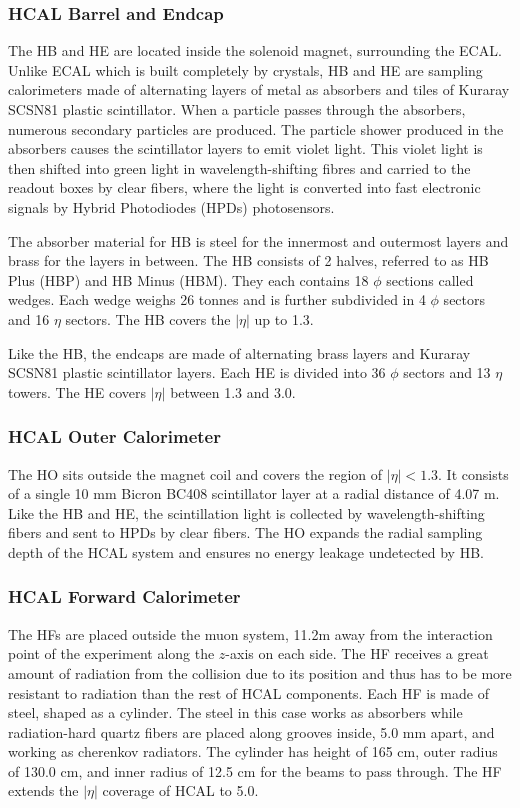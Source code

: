 \subsubsection{HCAL Barrel and Endcap}
The HB and HE are located inside the solenoid magnet, surrounding the ECAL. Unlike ECAL which is built completely by crystals, HB and HE are sampling calorimeters made of alternating layers of metal as absorbers and tiles of Kuraray SCSN81 plastic scintillator. When a particle passes through the absorbers, numerous secondary particles are produced. The particle shower produced in the absorbers causes the scintillator layers to emit violet light. This violet light is then shifted into green light in wavelength-shifting fibres and carried to the readout boxes by clear fibers, where the light is converted into fast electronic signals by Hybrid Photodiodes (HPDs) photosensors.

\vspace{0.3cm}
The absorber material for HB is steel for the innermost and outermost layers and brass for the layers in between. The HB consists of 2 halves, referred to as HB Plus (HBP) and HB Minus (HBM). They each contains 18 $\phi$ sections called wedges. Each wedge weighs 26 tonnes and is further subdivided in 4 $\phi$ sectors and 16 $\eta$ sectors. The HB covers the $|\eta|$ up to 1.3.

\vspace{0.3cm}
Like the HB, the endcaps are made of alternating brass layers and Kuraray SCSN81 plastic scintillator layers. Each HE is divided into 36 $\phi$ sectors and 13 $\eta$ towers. The HE covers $|\eta|$ between 1.3 and 3.0.

\subsubsection{HCAL Outer Calorimeter}
The HO sits outside the magnet coil and covers the region of $|\eta|<1.3$. It consists of a single 10 mm Bicron BC408 scintillator layer at a radial distance of 4.07 m. Like the HB and HE, the scintillation light is collected by wavelength-shifting fibers and sent to HPDs by clear fibers. The HO expands the radial sampling depth of the HCAL system and ensures no energy leakage undetected by HB.

\subsubsection{HCAL Forward Calorimeter}
The HFs are placed outside the muon system, 11.2m away from the interaction point of the experiment along the $z$-axis on each side. The HF receives a great amount of radiation from the collision due to its position and thus has to be more resistant to radiation than the rest of HCAL components. Each HF is made of steel, shaped as a cylinder. The steel in this case works as absorbers while radiation-hard quartz fibers are placed along grooves inside, 5.0 mm apart, and working as cherenkov radiators. The cylinder has height of 165 cm, outer radius of 130.0 cm, and inner radius of 12.5 cm for the beams to pass through. The HF extends the $|\eta|$ coverage of HCAL to 5.0.

